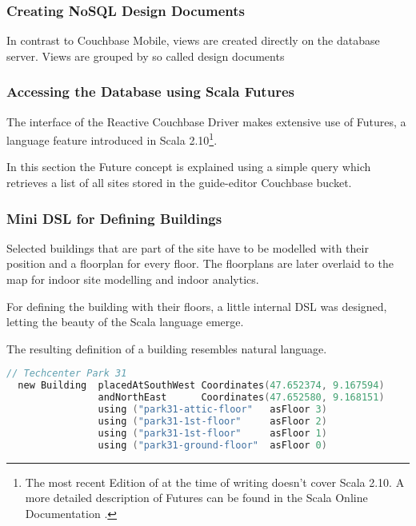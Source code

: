 
\subsubsection{Creating NoSQL Design Documents}

In contrast to Couchbase Mobile, views are created directly on the database server. Views are grouped by so called design documents  

\subsubsection{Accessing the Database using Scala Futures}

The interface of the Reactive Couchbase Driver makes extensive use of Futures, a language feature introduced in Scala 2.10\footnote{The most recent Edition of \cite{scala-book} at the time of writing doesn't cover Scala 2.10. A more detailed description of Futures can be found in the Scala Online Documentation \cite{scala-futures}.}.

In this section the Future concept is explained using a simple query which retrieves a list of all sites stored in the guide-editor Couchbase bucket.

\subsubsection{Mini DSL for Defining Buildings}

Selected buildings that are part of the site have to be modelled with their position and a floorplan for every floor. The floorplans are later overlaid to the map for indoor site modelling and indoor analytics.
  
For defining the building with their floors, a little internal DSL was designed, letting the beauty of the Scala language emerge.

The resulting definition of a building resembles natural language.

\begin{lstlisting}[caption={Definition of a building with its floors in Scala},basicstyle=\tiny\ttfamily,language=c,aboveskip=15pt]
// Techcenter Park 31
  new Building  placedAtSouthWest Coordinates(47.652374, 9.167594)
                andNorthEast      Coordinates(47.652580, 9.168151)
                using ("park31-attic-floor"   asFloor 3)
                using ("park31-1st-floor"     asFloor 2)
                using ("park31-1st-floor"     asFloor 1)
                using ("park31-ground-floor"  asFloor 0)
\end{lstlisting}

